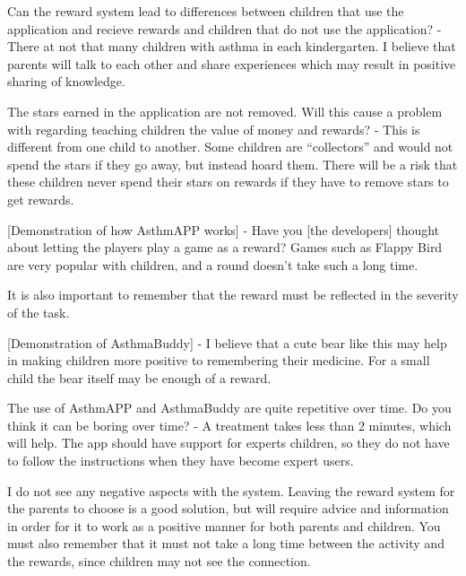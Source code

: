 Can the reward system lead to differences between children that use the application and recieve rewards and children that do not use the application? 
- There at not that many children with asthma in each kindergarten. I believe that parents will talk to each other and share experiences which may result in positive sharing of knowledge. 


The stars earned in the application are not removed. Will this cause a problem with regarding teaching children the value of money and rewards?
- This is different from one child to another. Some children are ``collectors'' and would not spend the stars if they go away, but instead hoard them. There will be a risk that these children never spend their stars on rewards if they have to remove stars to get rewards.

[Demonstration of how AsthmAPP works]
- Have you [the developers] thought about letting the players play a game as a reward? Games such as Flappy Bird  are very popular with children, and a round doesn't take such a long time. 


It is also important to remember that the reward must be reflected in the severity of the task. 


[Demonstration of AsthmaBuddy]
- I believe that a cute bear like this may help in making children more positive to remembering their medicine. For a small child the bear itself may be enough of a reward.


The use of AsthmAPP and AsthmaBuddy are quite repetitive over time. Do you think it can be boring over time?
- A treatment takes less than 2 minutes, which will help. The app should have support for experts children, so they do not have to follow the instructions when they have become expert users. 

I do not see any negative aspects with the system. Leaving the reward system for the parents to choose is a good solution, but will require advice and information in order for it to work as a positive manner for both parents and children. 
You must also remember that it must not take a long time between the activity and the rewards, since children may not see the connection.

